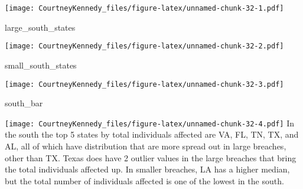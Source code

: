 \documentclass[
]{article}
\newenvironment{Shaded}{\begin{snugshade}}{\end{snugshade}}
\newcommand{\NormalTok}[1]{#1}
\begin{document}
\texttt{[image: CourtneyKennedy\_files/figure-latex/unnamed-chunk-32-1.pdf]}

\begin{Shaded}
\begin{Highlighting}[]
\NormalTok{large\_south\_states}
\end{Highlighting}
\end{Shaded}

\texttt{[image: CourtneyKennedy\_files/figure-latex/unnamed-chunk-32-2.pdf]}

\begin{Shaded}
\begin{Highlighting}[]
\NormalTok{small\_south\_states}
\end{Highlighting}
\end{Shaded}

\texttt{[image: CourtneyKennedy\_files/figure-latex/unnamed-chunk-32-3.pdf]}

\begin{Shaded}
\begin{Highlighting}[]
\NormalTok{south\_bar}
\end{Highlighting}
\end{Shaded}

\texttt{[image: CourtneyKennedy\_files/figure-latex/unnamed-chunk-32-4.pdf]}
In the south the top 5 states by total individuals affected are VA, FL,
TN, TX, and AL, all of which have distribution that are more spread out
in large breaches, other than TX. Texas does have 2 outlier values in
the large breaches that bring the total individuals affected up. In
smaller breaches, LA has a higher median, but the total number of
individuals affected is one of the lowest in the south.
\end{document}
